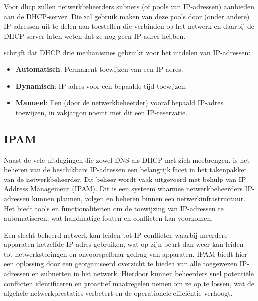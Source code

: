 Voor \acrshort{dhcp} zullen netwerkbeheerders subnets (of pools van IP-adressen) aanbieden aan de DHCP-server. Die zal gebruik maken van deze pools door (onder andere) IP-adressen uit te delen aan toestellen die verbinden op het netwerk en daarbij de DHCP-server laten weten dat ze nog geen IP-adres hebben.

\textcite{Droms1997} schrijft dat DHCP drie mechanismes gebruikt voor het uitdelen van IP-adressen:
\begin{itemize}
    \item \textbf{Automatisch}: Permanent toewijzen van een IP-adres.
    \item \textbf{Dynamisch}: IP-adres voor een bepaalde tijd toewijzen.
    \item \textbf{Manueel}: Een (door de netwerkbeheerder) vooraf bepaald IP-adres toewijzen, in vakjargon noemt met dit een IP-reservatie.
\end{itemize}

\subsection{IPAM}
Naast de vele uitdagingen die zowel DNS als DHCP met zich meebrengen, is het beheren van de beschikbare IP-adressen een belangrijk facet in het takenpakket van de netwerkbeheerder. Dit beheer wordt vaak uitgevoerd met behulp van IP Address Management (IPAM). 
Dit is een systeem waarmee netwerkbeheerders IP-adressen kunnen plannen, volgen en beheren binnen een netwerkinfrastructuur. 
Het biedt tools en functionaliteiten om de toewijzing van IP-adressen te automatiseren, wat handmatige fouten en conflicten kan voorkomen.

Een slecht beheerd netwerk kan leiden tot IP-conflicten waarbij meerdere apparaten hetzelfde IP-adres gebruiken, wat op zijn beurt dan weer kan leiden tot netwerkstoringen en onvoorspelbaar gedrag van apparaten. IPAM biedt hier een oplossing door een georganiseerd overzicht te bieden van alle toegewezen IP-adressen en subnetten in het netwerk. Hierdoor kunnen beheerders snel potentiële conflicten identificeren en proactief maatregelen nemen om ze op te lossen, wat de algehele netwerkprestaties verbetert en de operationele efficiëntie verhoogt.

